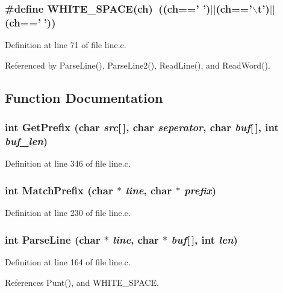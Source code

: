 \subsubsection{\setlength{\rightskip}{0pt plus 5cm}\#define WHITE\_\-SPACE(ch)~((ch==' ')$|$$|$(ch=='$\backslash$t')$|$$|$(ch==''))}\label{line_8c_88b83e3070fdd5709e43e4a0458ccd35}




Definition at line 71 of file line.c.

Referenced by Parse\-Line(), Parse\-Line2(), Read\-Line(), and Read\-Word().

\subsection{Function Documentation}
\subsubsection{\setlength{\rightskip}{0pt plus 5cm}int Get\-Prefix (char {\em src}[$\,$], char {\em seperator}, char {\em buf}[$\,$], int {\em buf\_\-len})}\label{line_8c_ac3f1b6ac89780b864d10892481e21f8}




Definition at line 346 of file line.c.
\subsubsection{\setlength{\rightskip}{0pt plus 5cm}int Match\-Prefix (char $\ast$ {\em line}, char $\ast$ {\em prefix})}\label{line_8c_b7c2331b3542552b253c5b30d5f9131f}




Definition at line 230 of file line.c.
\subsubsection{\setlength{\rightskip}{0pt plus 5cm}int Parse\-Line (char $\ast$ {\em line}, char $\ast$ {\em buf}[$\,$], int {\em len})}\label{line_8c_d9ff5c7b4c5f922f6fe521ab9fb1d3e4}




Definition at line 164 of file line.c.

References Punt(), and WHITE\_\-SPACE.
